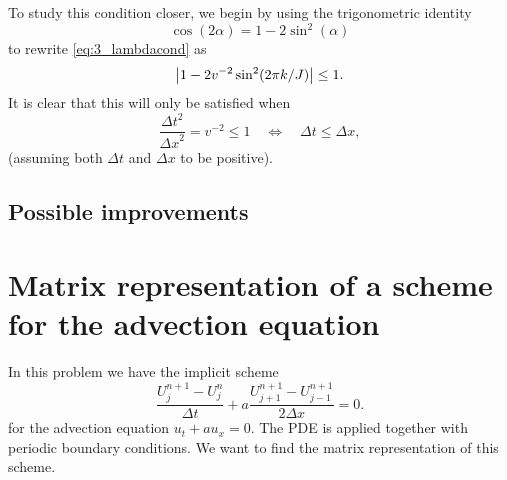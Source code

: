 \documentclass[11pt,letter, swedish, english
]{article}
\newcommand{\Dx}{\ensuremath{\Delta{x}}}
\newcommand{\Dt}{\ensuremath{\Delta{t}}}
\begin{document}
To study this condition closer, we begin by using the trigonometric
identity
\begin{equation}
\cos(2\alpha)=1-2\sin^2(\alpha)
\end{equation}
to rewrite \eqref{eq:3_lambdacond} as
\begin{equation}
\abs{1-2v^{-2}\sin^2(2\pi k/J)}\le1.
\end{equation}
It is clear that this will only be satisfied when
\begin{equation}
\frac{\Dt^2}{\Dx^2}=v^{-2}\le1
\quad\Longleftrightarrow\quad
\Dt\le\Dx,
\end{equation}
(assuming both $\Dt$ and $\Dx$ to be positive).

\subsection{Possible improvements}




\section{Matrix representation of a scheme for the advection equation}
\newcommand{\odelta}[1]{{\mathring{\delta}^{(J)}_{#1}}}
In this problem we have the implicit scheme
\begin{equation}
\frac{U_j^{n+1}-U_j^n}{\Dt}
+a\frac{U_{j+1}^{n+1}-U_{j-1}^{n+1}}{2\Dx}=0.
\end{equation}
for the advection equation $u_t+au_x=0$. The PDE is applied
together with periodic boundary conditions.
We want to find the matrix representation of this scheme.
\end{document}
